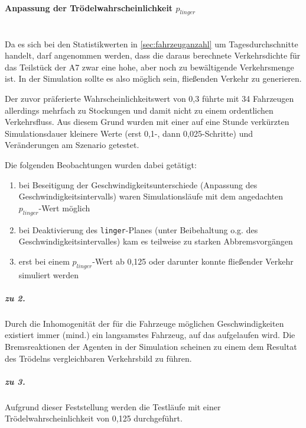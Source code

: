 \paragraph*{Anpassung der Trödelwahrscheinlichkeit $p_{linger}$}
\label{sec:adjust-linger}
\hfill \\
Da es sich bei den Statistikwerten in \cref{sec:fahrzeuganzahl} um Tagesdurchschnitte handelt, darf angenommen werden, dass die daraus berechnete Verkehrsdichte für das Teilstück der A7 zwar eine hohe, aber noch zu bewältigende Verkehrsmenge ist.
In der Simulation sollte es also möglich sein, fließenden Verkehr zu generieren.

Der zuvor präferierte Wahrscheinlichkeitswert von 0,3 führte mit 34 Fahrzeugen allerdings mehrfach zu Stockungen und damit nicht zu einem ordentlichen Verkehrsfluss.
Aus diesem Grund wurden mit einer auf eine Stunde verkürzten Simulationsdauer kleinere Werte (erst 0,1-, dann 0,025-Schritte) und Veränderungen am Szenario getestet.

Die folgenden Beobachtungen wurden dabei getätigt:
\begin{enumerate}
	\itemsep0em
	\item bei Beseitigung der Geschwindigkeitsunterschiede (Anpassung des Geschwindigkeitsintervalls) waren Simulationsläufe mit dem angedachten $p_{linger}$-Wert möglich
	\item bei Deaktivierung des \texttt{linger}-Planes (unter Beibehaltung o.g. des Geschwindigkeitsintervalles) kam es teilweise zu starken Abbremsvorgängen
	\item erst bei einem $p_{linger}$-Wert ab 0,125 oder darunter konnte fließender Verkehr simuliert werden
\end{enumerate}

\subparagraph*{zu 2.} Durch die Inhomogenität der für die Fahrzeuge möglichen Geschwindigkeiten existiert immer (mind.) ein langsamstes Fahrzeug, auf das aufgelaufen wird.
Die Bremsreaktionen der Agenten in der Simulation scheinen zu einem dem Resultat des Trödelns vergleichbaren Verkehrsbild zu führen.

\subparagraph*{zu 3.} Aufgrund dieser Feststellung werden die Testläufe mit einer Trödelwahrscheinlichkeit von 0,125 durchgeführt.




